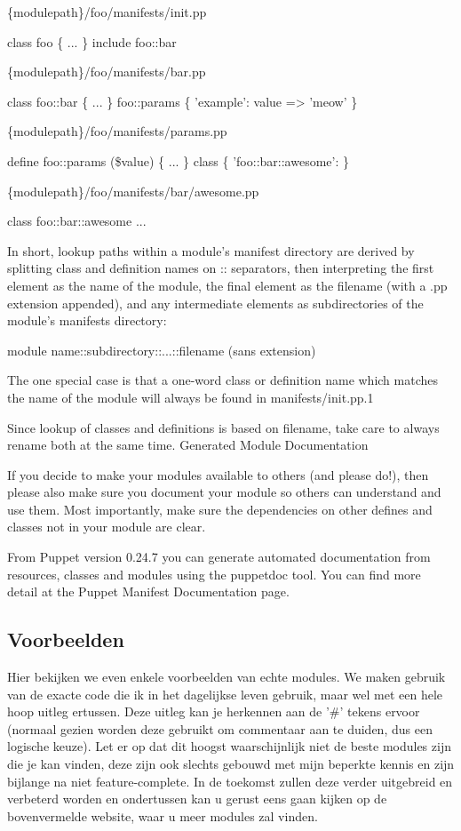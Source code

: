 \{modulepath\}/foo/manifests/init.pp

class foo \{ ... \}
include foo::bar 	

\{modulepath\}/foo/manifests/bar.pp

class foo::bar \{ ... \}
foo::params \{ 'example': value => 'meow' \} 	

\{modulepath\}/foo/manifests/params.pp

define foo::params (\$value) \{ ... \}
class \{ 'foo::bar::awesome': \} 	

\{modulepath\}/foo/manifests/bar/awesome.pp

class foo::bar::awesome { ... }

In short, lookup paths within a module's manifest directory are derived by splitting class and definition names on :: separators, then interpreting the first element as the name of the module, the final element as the filename (with a .pp extension appended), and any intermediate elements as subdirectories of the module's manifests directory:

{module name}::{subdirectory}::{...}::{filename (sans extension)}

The one special case is that a one-word class or definition name which matches the name of the module will always be found in manifests/init.pp.1

Since lookup of classes and definitions is based on filename, take care to always rename both at the same time.
Generated Module Documentation

If you decide to make your modules available to others (and please do!), then please also make sure you document your module so others can understand and use them. Most importantly, make sure the dependencies on other defines and classes not in your module are clear.

From Puppet version 0.24.7 you can generate automated documentation from resources, classes and modules using the puppetdoc tool. You can find more detail at the Puppet Manifest Documentation page.

\subsection{Voorbeelden}
Hier bekijken we even enkele voorbeelden van echte modules. We maken gebruik van de exacte code die ik in het dagelijkse leven gebruik, maar wel met een hele hoop uitleg ertussen. Deze uitleg kan je herkennen aan de '\#' tekens ervoor (normaal gezien worden deze gebruikt om commentaar aan te duiden, dus een logische keuze). Let er op dat dit hoogst waarschijnlijk niet de beste modules zijn die je kan vinden, deze zijn ook slechts gebouwd met mijn beperkte kennis en zijn bijlange na niet feature-complete. In de toekomst zullen deze verder uitgebreid en verbeterd worden en ondertussen kan u gerust eens gaan kijken op de bovenvermelde website, waar u meer modules zal vinden.

